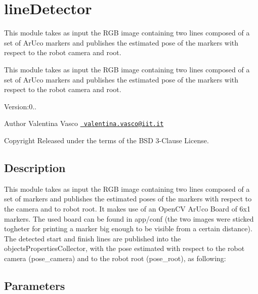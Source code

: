 \section{line\+Detector}
\label{group__lineDetector}


This module takes as input the R\+GB image containing two lines composed of a set of Ar\+Uco markers and publishes the estimated pose of the markers with respect to the robot camera and root.  


This module takes as input the R\+GB image containing two lines composed of a set of Ar\+Uco markers and publishes the estimated pose of the markers with respect to the robot camera and root. 

Version\+:0.. \begin{DoxyAuthor}{Author}
Valentina Vasco \href{mailto:valentina.vasco@iit.it}{\texttt{ valentina.\+vasco@iit.\+it}} ~\newline
 
\end{DoxyAuthor}
\begin{DoxyCopyright}{Copyright}
Released under the terms of the B\+SD 3-\/Clause License. 
\end{DoxyCopyright}
\hypertarget{group__skeletonViewer_intro_sec}{}\subsection{Description}\label{group__skeletonViewer_intro_sec}
This module takes as input the R\+GB image containing two lines composed of a set of markers and publishes the estimated poses of the markers with respect to the camera and to robot root. It makes use of an Open\+CV Ar\+Uco Board of 6x1 markers. The used board can be found in {\ttfamily app/conf} (the two images were sticked togheter for printing a marker big enough to be visible from a certain distance). The detected start and finish lines are published into the objects\+Properties\+Collector, with the pose estimated with respect to the robot camera ({\ttfamily pose\+\_\+camera}) and to the robot root ({\ttfamily pose\+\_\+root}), as following\+:


\begin{DoxyCode}{0}
\end{DoxyCode}
\hypertarget{group__skeletonViewer_parameters_sec}{}\subsection{Parameters}\label{group__skeletonViewer_parameters_sec}

